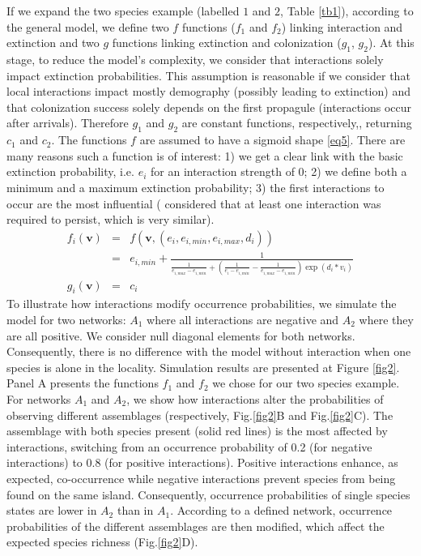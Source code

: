 If we expand the two species example (labelled $1$ and $2$, Table \ref{tb1}), according to the general model, we define two $f$ functions ($f_1$ and $f_2$) linking interaction and extinction and two $g$ functions linking extinction and colonization ($g_1$, $g_2$). At this stage, to reduce the model's complexity, we consider that interactions solely impact extinction probabilities. This assumption is reasonable if we consider that local interactions impact mostly demography (possibly leading to extinction) and that colonization success solely depends on the first propagule (interactions occur after arrivals). Therefore $g_1$ and $g_2$ are constant functions, respectively,, returning $c_1$ and $c_2$. The functions $f$ are assumed to have a sigmoid shape \eqref{eq5}. There are many reasons such a function is of interest: 1) we get a clear link with the basic extinction probability, i.e. $e_i$ for an interaction strength of 0; 2) we define both a minimum and a maximum extinction probability; 3) the first interactions to occur are the most influential (\cite{Gravel2011Trophic} considered that at least one interaction was required to persist, which is very similar).
\begin{eqnarray}
\nonumber f_i(\mathbf{v})&=&f(\mathbf{v},(e_i,e_{i,min},e_{i,max},d_i)) \\
\label{eq5} &=&e_{i,min}+\frac{1}{\frac{1}{e_{i,max}-e_{i,min}}+\left(\frac{1}{e_{i}-e_{i,min}}-\frac{1}{e_{i,max}-e_{i,min}}\right) \exp(d_i*v_i)}  \\
g_i(\mathbf{v})&=&c_i
\end{eqnarray}
To illustrate how interactions modify occurrence probabilities, we simulate the model for two networks: $A_1$ where all interactions are negative and $A_2$ where they are all positive. We consider null diagonal elements for both networks. Consequently, there is no difference with the model without interaction when one species is alone in the locality. Simulation results are presented at Figure \ref{fig2}. Panel A presents the functions $f_1$ and $f_2$ we chose for our two species example. For networks $A_1$ and $A_2$, we show how interactions alter the probabilities of observing different assemblages (respectively, Fig.\ref{fig2}B and Fig.\ref{fig2}C). The assemblage with both species present (solid red lines) is the most affected by interactions, switching from an occurrence probability of 0.2 (for negative interactions) to 0.8 (for positive interactions). Positive interactions enhance, as expected, co-occurrence while negative interactions prevent species from being found on the same island. Consequently, occurrence probabilities of single species states are lower in $A_2$ than in $A_1$. According to a defined network, occurrence probabilities of the different assemblages are then modified, which affect the expected species richness (Fig.\ref{fig2}D).

